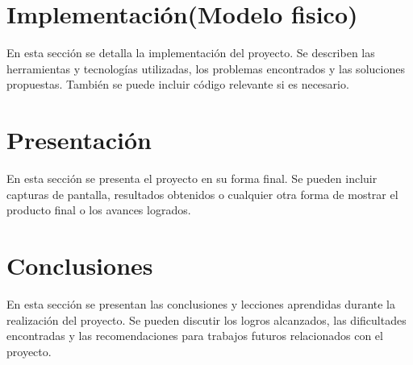 \documentclass{article}
\begin{document}
\section*{Implementación(Modelo fisico)}
En esta sección se detalla la implementación del proyecto. Se describen las herramientas y tecnologías utilizadas, los problemas encontrados y las soluciones propuestas. También se puede incluir código relevante si es necesario.

\section*{Presentación}
En esta sección se presenta el proyecto en su forma final. Se pueden incluir capturas de pantalla, resultados obtenidos o cualquier otra forma de mostrar el producto final o los avances logrados.

\section*{Conclusiones}
En esta sección se presentan las conclusiones y lecciones aprendidas durante la realización del proyecto. Se pueden discutir los logros alcanzados, las dificultades encontradas y las recomendaciones para trabajos futuros relacionados con el proyecto.
\end{document}
